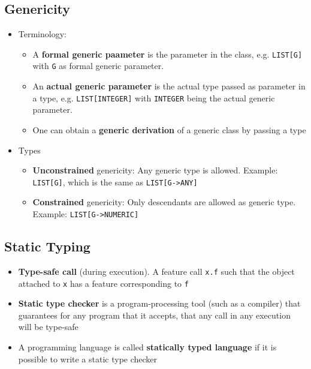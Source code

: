 \documentclass[a4paper]{article}
\newcommand{\inline}[1]{\lstinline!#1!}%
\begin{document}
\subsection{Genericity}
\begin{itemize}
\item Terminology:
\begin{itemize}
\item A \textbf{formal generic paameter} is the parameter in the class, e.g. \inline{LIST[G]} with \inline{G} as formal generic parameter.
\item An \textbf{actual generic parameter} is the actual type passed as parameter in a type, e.g. \inline{LIST[INTEGER]} with \inline{INTEGER} being the actual generic parameter. 
\item One can obtain a \textbf{generic derivation} of a generic class by passing a type
\end{itemize}
\item Types
\begin{itemize}
\item \textbf{Unconstrained} genericity: Any generic type is allowed. Example: \inline{LIST[G]}, which is the same as \inline{LIST[G->ANY]}
\item \textbf{Constrained} genericity: Only descendants are allowed as generic type. Example: \inline{LIST[G->NUMERIC]}
\end{itemize}
\end{itemize}

\subsection{Static Typing}
\begin{itemize}
\item \textbf{Type-safe call} (during execution). A feature call \inline{x.f} such that the object attached to \inline{x} has a feature corresponding to \inline{f}
\item \textbf{Static type checker} is a program-processing tool (such as a compiler) that guarantees for any program that it accepts, that any call in any execution will be type-safe
\item A programming language is called \textbf{statically typed language} if it is possible to write a static type checker
\end{itemize}
\end{document}

